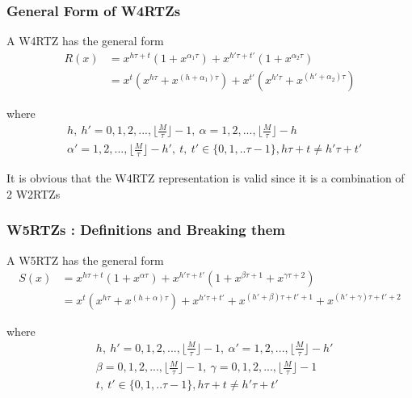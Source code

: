 \subsubsection{General Form of W4RTZs}
A W4RTZ has the general form
 \begin{equation}
 \begin{split}
  R(x)&=x^{h\tau+t}(1+x^{\alpha_1 \tau}) + x^{h'\tau+t'}(1+x^{\alpha_2 \tau})\\
  &= x^t(x^{h\tau}+x^{(h+\alpha_1)\tau}) + x^{t'}(x^{h'\tau}+x^{(h'+\alpha_2)\tau})
 \end{split}
 \end{equation}
	
where 
\begin{equation*}
\begin{split}
&h,~h'=0,1,2,...,\Big\lfloor \frac{M}{\tau} \Big\rfloor-1,~
 \alpha=1,2,...,\Big\lfloor \frac{M}{\tau} \Big\rfloor-h\\
& \alpha'=1,2,...,\Big\lfloor \frac{M}{\tau} \Big\rfloor-h',~
t,~t' \in\{0,1,..\tau-1\},h\tau+t \neq h'\tau+t'
\end{split}
\end{equation*}

It is obvious that the W4RTZ representation is valid since it is a combination of 2 W2RTZs

\subsubsection{W5RTZs : Definitions and Breaking them}
A W5RTZ has the general form
\begin{equation}
\begin{split}
 S(x)&=x^{h\tau+t}(1+x^{\alpha \tau}) 
	+
	x^{h'\tau+t'}(1+x^{\beta \tau +1}+x^{\gamma \tau +2})\\
	&= 
	x^t(x^{h\tau}+x^{(h+\alpha)\tau}) 
	+x^{h'\tau+t'}+x^{(h'+\beta) \tau +t'+1}+x^{(h'+\gamma) \tau +t'+2}
	\end{split}
	\end{equation}
	
where \begin{equation*}
\begin{split}
&h,~h'=0,1,2,...,\Big\lfloor \frac{M}{\tau} \Big\rfloor-1
,~\alpha'=1,2,...,\Big\lfloor \frac{M}{\tau} \Big\rfloor-h'\\
&\beta=0,1,2,...,\Big\lfloor \frac{M}{\tau} \Big\rfloor-1
,~\gamma=0,1,2,...,\Big\lfloor \frac{M}{\tau} \Big\rfloor-1\\
&t,~t' \in\{0,1,..\tau-1\},h\tau+t \neq h'\tau+t'
\end{split}
\end{equation*}

